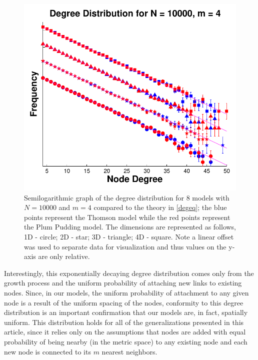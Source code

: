 \documentclass[aps,pre,reprint,superscriptaddress,amsmath,amssymb,nofootinbib]{revtex4-1}
\begin{document}
\begin{figure}
\includegraphics[width=\linewidth]{figures/fig11.pdf}
\caption{\label{degdist}Semilogarithmic graph of the degree distribution for 8 models with $N = 10000$ and $m = 4$ compared to the theory in \eqref{degeq}; the blue points represent the Thomson model while the red points represent the Plum Pudding model. The dimensions are represented as follows, 1D - circle; 2D - star; 3D - triangle; 4D - square. Note a linear offset was used to separate data for visualization and thus values on the y-axis are only relative.}
\end{figure}
Interestingly, this exponentially decaying degree distribution comes only from the growth process and the uniform probability of attaching new links to existing nodes.  
Since, in our models, the uniform probability of attachment to any given node is a result of the uniform spacing of the nodes, conformity to this degree distribution is an important confirmation that our models are, in fact, spatially uniform.
This distribution holds for all of the generalizations presented in this article, since it relies only on the assumptions that nodes are added with equal probability of being nearby (in the metric space) to any existing node and each new node is connected to its $m$ nearest neighbors.
\end{document}
